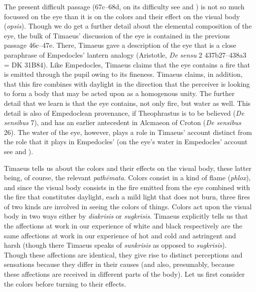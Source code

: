 The present difficult passage (67c--68d, on its difficulty see \citealt[479]{Taylor:1928qb} and \citealt[276]{Cornford:1935fk}) is not so much focussed on the eye than it is on the colors and their effect on the visual body (\emph{opsis}). Though we do get a further detail about the elemental composition of the eye, the bulk of Timaeus' discussion of the eye is contained in the previous passage 46c--47e. There, Timaeus gave a description of the eye that is a close paraphrase of Empedocles' lantern analogy (Aristotle, \emph{De sensu} 2 437b27--438a3 = DK 31B84). Like Empedocles, Timaeus claims that the eye contains a fire that is emitted through the pupil owing to its fineness. Timaeus claims, in addition, that this fire combines with daylight in the direction that the perceiver is looking to form a body that may be acted upon as a homogenous unity. The further detail that we learn is that the eye contains, not only fire, but water as well. This detail is also of Empedoclean provenance, if Theophrastus is to be believed (\emph{De sensibus} 7), and has an earlier antecedent in Alcmaeon of Croton (\emph{De sensibus} 26). The water of the eye, however, plays a role in Timaeus' account distinct from the role that it plays in Empedocles' (on the eye's water in Empedocles' account see \citealt{Ierodiakonou:2005fk} and \citealt[chapter 1]{Kalderon:2015fr}).

Timaeus tells us about the colors and their effects on the visual body, these latter being, of course, the relevant \emph{pathēmata}. Colors consist in a kind of flame (\emph{phlox}), and since the visual body consists in the fire emitted from the eye combined with the fire that constitutes daylight, each a mild light that does not burn, three fires of two kinds are involved in seeing the colors of things. Colors act upon the visual body in two ways either by \emph{diakrisis} or \emph{sugkrisis}. Timaeus explicitly tells us that the affections at work in our experience of white and black respectively are the same affections at work in our experience of hot and cold and astringent and harsh (though there Timaeus speaks of \emph{sunkrisis} as opposed to \emph{sugkrisis}). Though these affections are identical, they give rise to distinct perceptions and sensations because they differ in their causes (and also, presumably, because these affections are received in different parts of the body). Let us first consider the colors before turning to their effects.

